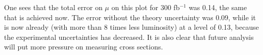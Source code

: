 One sees that the total error on $\mu $ on this plot for 300 fb$^{-1}$ was 0.14, the same that is achieved now.
The error without the theory uncertainty was 0.09, while it is now already (with more than 8 times less luminosity) at a level of 0.13, because the experimental uncertainties has decreased.
It is also clear that future analysis will put more pressure on measuring cross sections.
